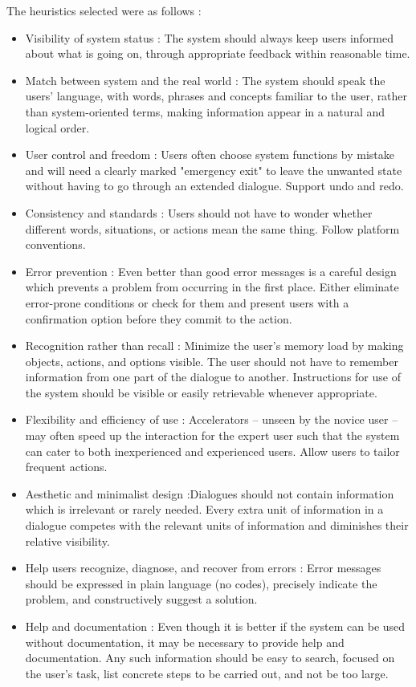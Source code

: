 \documentclass{article}
\begin{document}
The heuristics selected were as follows : 
\begin{itemize}
\item Visibility of system status : The system should always keep users informed about what is going on, through appropriate feedback within reasonable time. 

\item Match between system and the real world : The system should speak the users' language, with words, phrases and concepts familiar to the user, rather than system-oriented terms, making information appear in a natural and logical order.
 
\item User control and freedom : Users often choose system functions by mistake and will need a clearly marked "emergency exit" to leave the unwanted state without having to go through an extended dialogue. Support undo and redo. 

\item Consistency and standards : Users should not have to wonder whether different words, situations, or actions mean the same thing. Follow platform conventions. 

\item Error prevention : Even better than good error messages is a careful design which prevents a problem from occurring in the first place. Either eliminate error-prone conditions or check for them and present users with a confirmation option before they commit to the action. 

\item Recognition rather than recall : Minimize the user's memory load by making objects, actions, and options visible. The user should not have to remember information from one part of the dialogue to another. Instructions for use of the system should be visible or easily retrievable whenever appropriate. 

\item Flexibility and efficiency of use : Accelerators -- unseen by the novice user -- may often speed up the interaction for the expert user such that the system can cater to both inexperienced and experienced users. Allow users to tailor frequent actions. 
    
\item Aesthetic and minimalist design :Dialogues should not contain information which is irrelevant or rarely needed. Every extra unit of information in a dialogue competes with the relevant units of information and diminishes their relative visibility. 
    
\item Help users recognize, diagnose, and recover from errors : Error messages should be expressed in plain language (no codes), precisely indicate the problem, and constructively suggest a solution. 
    
\item Help and documentation : Even though it is better if the system can be used without documentation, it may be necessary to provide help and documentation. Any such information should be easy to search, focused on the user's task, list concrete steps to be carried out, and not be too large.    
\end{itemize}
\end{document}
